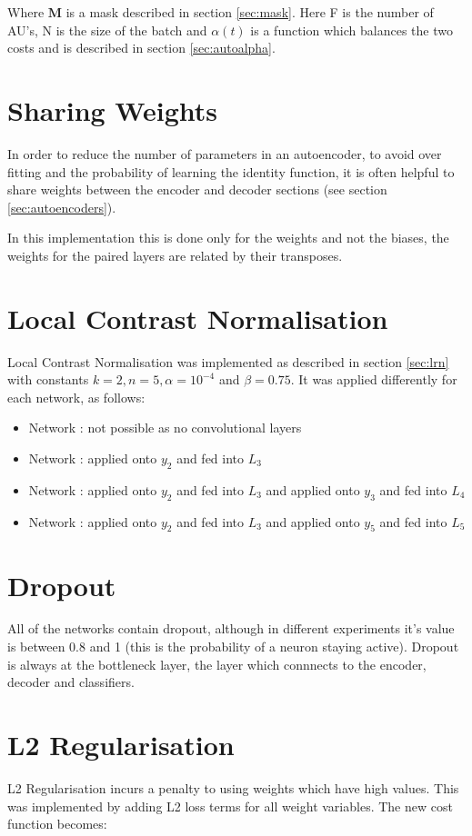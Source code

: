     Where $\mathbf{M}$ is a mask described in section \ref{sec:mask}. Here F is the number of AU's, N is the size of the batch and $\alpha(t)$ is a
    function which balances the two costs and is described in section \ref{sec:autoalpha}.

    

  \clearpage


  \section{Sharing Weights}
    In order to reduce the number of parameters in an autoencoder, to avoid over
    fitting and the probability of learning the identity function, it is often
    helpful to share weights between the encoder and decoder sections (see section
    \ref{sec:autoencoders}).

    In this implementation this is done only for the weights and not the biases,
    the weights for the paired layers are related by their transposes.
  \section{Local Contrast Normalisation}
    Local Contrast Normalisation was implemented as described in section \ref{sec:lrn} with
    constants $k=2,n=5,\alpha=10^{-4}$ and $\beta=0.75$.
    It was applied differently for each network, as follows:
    \begin{itemize}
      \item Network \networkI   : not possible as no convolutional layers
      \item Network \networkII  : applied onto $y_2$ and fed into $L_3$
      \item Network \networkIII : applied onto $y_2$ and fed into $L_3$ and applied onto $y_3$ and fed into $L_4$
      \item Network \networkIV  : applied onto $y_2$ and fed into $L_3$ and applied onto $y_5$ and fed into $L_5$
    \end{itemize}
  \section{Dropout}
    All of the networks contain dropout, although in different experiments it's
    value is between 0.8 and 1 (this is the probability of a neuron staying
    active). Dropout is always at the bottleneck layer, the layer which
    connnects to the encoder, decoder and classifiers.
  \section{L2 Regularisation}
    L2 Regularisation incurs a penalty to using weights which have high values.
    This was implemented by adding L2 loss terms for all weight variables. The
    new cost function becomes:

